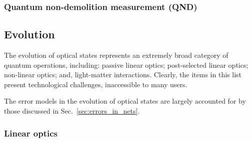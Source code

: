 \documentclass[aps,rmp,twocolumn,amsmath,amssymb,nofootinbib,superscriptaddress,longbibliography,floatfix,table-of-contents,eqsecnum]{revtex4-1}
\newcommand{\comment}[1]{{\color{blue}{\textbf{#1}}}}
\begin{document}
%
%

\subsubsection{Quantum non-demolition measurement (QND)}

\comment{To do!}

%
%

\subsection{Evolution}

The evolution of optical states represents an extremely broad category of quantum operations, including: passive linear optics; post-selected linear optics; non-linear optics; and, light-matter interactions. Clearly, the items in this list present technological challenges, inaccessible to many users.

The error models in the evolution of optical states are largely accounted for by those discussed in Sec.~\ref{sec:errors_in_nets}. 

%
%

\subsubsection{Linear optics} \label{sec:LO_ev_archs} 
\end{document}
